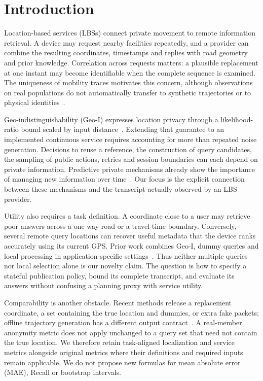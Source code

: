 \section{Introduction}\label{sec:intro}
Location-based services (LBSs) connect private movement to remote information retrieval. A
device may request nearby facilities repeatedly, and a provider can combine the resulting
coordinates, timestamps and replies with road geometry and prior knowledge. Correlation across
requests matters: a plausible replacement at one instant may become identifiable when the
complete sequence is examined. The uniqueness of mobility traces motivates this concern,
although observations on real populations do not automatically transfer to synthetic
trajectories or to physical identities~\cite{mobilityunique}.

Geo-indistinguishability (Geo-I) expresses location privacy through a likelihood-ratio bound
scaled by input distance~\cite{geoi}. Extending that guarantee to an implemented continuous
service requires accounting for more than repeated noise generation. Decisions to reuse a
reference, the construction of query candidates, the sampling of public actions, retries and
session boundaries can each depend on private information. Predictive private mechanisms
already show the importance of managing new information over time~\cite{predictive}.
Our focus is the explicit connection between these mechanisms and the transcript actually
observed by an LBS provider.

Utility also requires a task definition. A coordinate close to a user may retrieve poor
answers across a one-way road or a travel-time boundary. Conversely, several remote query
locations can recover useful metadata that the device ranks accurately using its current
GPS. Prior work combines Geo-I, dummy queries and local processing in application-specific
settings~\cite{ev}. Thus neither multiple queries nor local selection alone is our novelty
claim. The question is how to specify a stateful publication policy, bound its complete
transcript, and evaluate its answers without confusing a planning proxy with service utility.

Comparability is another obstacle. Recent methods release a replacement coordinate, a set
containing the true location and dummies, or extra fake packets; offline trajectory generation
has a different output contract~\cite{transprotect,semantic,fake,sok}. A real-member anonymity
metric does not apply unchanged to a query set that need not contain the true location.
We therefore retain task-aligned localization and service metrics alongside original metrics
where their definitions and required inputs remain applicable. We do not propose new formulas
for mean absolute error (MAE), Recall or bootstrap intervals.


